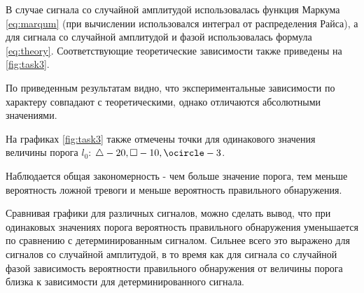 В случае сигнала со случайной амплитудой использовалась функция Маркума \eqref{eq:marqum} 
(при вычислении использовался интеграл от распределения Райса), а для сигнала со случайной амплитудой и фазой
использовалась формула \eqref{eq:theory}. Соответствующие теоретические зависимости также приведены на \ref{fig:task3}.

По приведенным результатам видно, что экспериментальные зависимости по характеру совпадают с теоретическими,
однако отличаются абсолютными значениями.

На графиках \ref{fig:task3} также отмечены точки для одинакового значения величины порога $l_0$: $\triangle - 20, \square - 10, \ocircle - 3$.

Наблюдается общая закономерность - чем больше значение порога, тем меньше вероятность
ложной тревоги и меньше вероятность правильного обнаружения.

Сравнивая графики для 
различных сигналов, можно сделать вывод, что при одинаковых значениях порога вероятность правильного
обнаружения уменьшается по сравнению с детерминированным сигналом.
Сильнее всего это выражено для сигналов со случайной амплитудой, в то время как для сигнала
со случайной фазой зависимость вероятности правильного обнаружения от величины порога близка
к зависимости для детерминированного сигнала.


